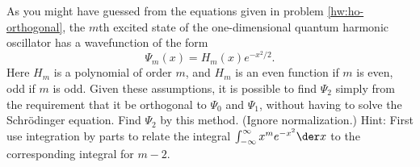 As you might have guessed from the equations given in problem \ref{hw:ho-orthogonal},
the $m$th excited state of the one-dimensional quantum harmonic oscillator has
a wavefunction of the form
\begin{equation*}
  \Psi_m(x)=H_m(x)e^{-x^2/2}.
\end{equation*}
Here $H_m$ is a polynomial of order $m$, and $H_m$ is an even function if $m$ is
even, odd if $m$ is odd. Given these assumptions, it is possible to find $\Psi_2$
simply from the requirement that it be orthogonal to $\Psi_0$ and $\Psi_1$, without
having to solve the Schr\"{o}dinger equation. Find $\Psi_2$ by this method. (Ignore normalization.)
Hint: First use integration by parts to relate the integral
$\int_{-\infty}^{\infty}x^m e^{-x^2}\der x$ to the corresponding integral
for $m-2$.

